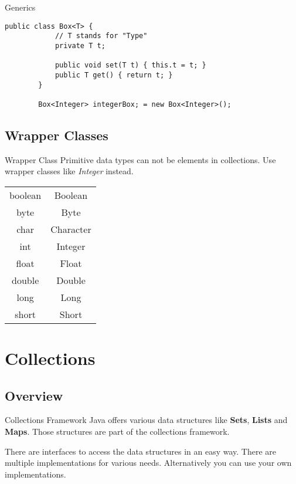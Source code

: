 \begin{frame}[fragile]{Generics}
	\begin{lstlisting}[basicstyle=\ttfamily\scriptsize]
		public class Box<T> {
		    // T stands for "Type"
		    private T t;

		    public void set(T t) { this.t = t; }
		    public T get() { return t; }
		}
		
		Box<Integer> integerBox; = new Box<Integer>();

	\end{lstlisting}
\end{frame}

\subsection{Wrapper Classes}

\begin{frame}{Wrapper Class}
	Primitive data types can not be elements in collections. 
	Use wrapper classes like \emph{Integer} instead.
	\begin{center}
		\begin{tabular}{ c  c }
			boolean & Boolean \\
			byte & Byte \\
			char & Character \\
			int & Integer \\
			float & Float \\
			double & Double \\
			long & Long \\
			short & Short
		\end{tabular}
	\end{center}
\end{frame}

\section{Collections}
\subsection{Overview}
\begin{frame}{Collections Framework}
	Java offers various data structures like \textbf{Sets}, \textbf{Lists} and \textbf{Maps}.
	Those structures are part of the collections framework.

	There are interfaces to access the data structures in an easy way.
	There are multiple implementations for various needs.
	Alternatively you can use your own implementations.
\end{frame}

